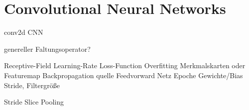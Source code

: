 \section{Convolutional Neural Networks}
\label{convolutional_neural_networks}


\gls{conv2d}
\gls{CNN}

genereller Faltungsoperator?

Receptive-Field
Learning-Rate
Loss-Function
Overfitting
Merkmalskarten oder Featuremap
Backpropagation quelle
Feedvorward Netz
Epoche
Gewichte/Bias
Stride, Filtergröße

Stride Slice Pooling

